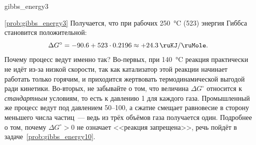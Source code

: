 \begin{problem}{}{gibbs_energy3}
\begin{sol}{\ref{prob:gibbs_energy3}}
        Получается, что при рабочих \qty{250}{\degreeCelsius} (\qty{523}{\ruK}) энергия Гиббса становится положительной:
        \begin{equation*}
            \Delta G^{\circ} = \num{-90,6} + \num{523} \cdot \num{0,2196} \approx +\qty{24,3}{\ruKJ\per\ruMole}.
        \end{equation*}
        Почему процесс ведут именно так? Во-первых, при \qty{140}{\degreeCelsius} реакция практически не идёт из-за низкой скорости, так как катализатор этой реакции начинает работать только горячим, и приходится жертвовать термодинамической выгодой ради кинетики. Во-вторых, не забывайте о том, что величина $\Delta G^{\circ}$ относится к \emph{стандартным} условиям, то есть к давлению \qty{1}{\ruAtm} для каждого газа. Промышленный же процесс ведут под давлением \num{50}--\qty{100}{\ruAtm}, а сжатие смещает равновесие в сторону меньшего числа частиц~--- ведь из трёх объёмов газа получается один. Подробнее о том, почему $\Delta G^{\circ} > 0$ не означает <<реакция запрещена>>, речь пойдёт в задаче~\ref{prob:gibbs_energy10}.
    \end{sol}
\end{problem}

